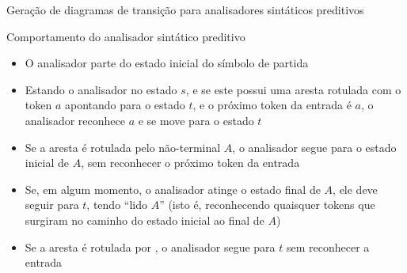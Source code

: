 \begin{frame}[fragile]{Geração de diagramas de transição para analisadores sintáticos preditivos}

    \begin{algorithmic}[1]

        \vspace{0.2in}

        \Statex
            \EndFor
        \EndFor
    \end{algorithmic}

\end{frame}

\begin{frame}[fragile]{Comportamento do analisador sintático preditivo}

    \begin{itemize}
        \item O analisador parte do estado inicial do símbolo de partida
        \pause

        \item Estando o analisador no estado $s$, e se este possui uma aresta rotulada com o token $a$ apontando para o estado $t$, e o próximo token da entrada
            é $a$, o analisador reconhece $a$ e se move para o estado $t$
        \pause

        \item Se a aresta é rotulada pelo não-terminal $A$, o analisador segue para o estado inicial de $A$, sem reconhecer o próximo token da entrada
        \pause

        \item Se, em algum momento, o analisador atinge o estado final de $A$, ele deve seguir para $t$, tendo ``lido $A$'' (isto é, reconhecendo quaisquer
            tokens que surgiram no caminho do estado inicial ao final de $A$)
        \pause

        \item Se a aresta é rotulada por , o analisador segue para $t$ sem reconhecer a entrada
    \end{itemize}

\end{frame}

